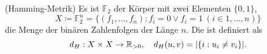 \begin{example}(Hamming-Metrik)
  Es ist $ \mathbb{F}_2 $ der Körper mit zwei Elementen $ \{ 0, 1 \} $,
  \begin{equation*}
    X \coloneqq \mathbb{F}_2^n = \{ (f_1, \dots, f_n) : f_i = 0 \vee f_i = 1 \ (i \in {1, \dots, n}) \}
  \end{equation*}
  die Menge der binären Zahlenfolgen der Länge $ n $. Die  ist definiert als
  \begin{equation*}
    d_H: X \times X \to \mathbb{R}_{>0}, \quad d_H(u,v) = |\{ i : u_i \neq v_i \}|\text{.}
  \end{equation*}
\end{example}